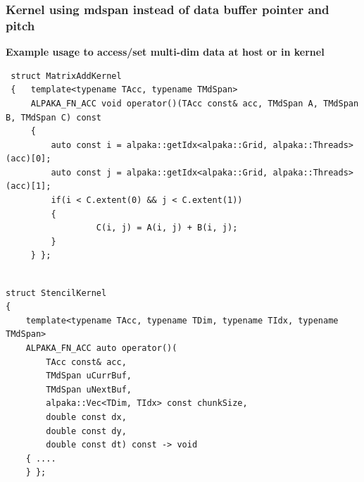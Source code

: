 \documentclass[9pt]{beamer}
\begin{document}
\begin{frame} [fragile]
\frametitle{Kernel using mdspan instead of data buffer pointer and pitch}
\lstset{basicstyle=\ttfamily\tiny}

\textbf{Example usage to access/set multi-dim data at host or in kernel}
 \lstset{basicstyle=\ttfamily\scriptsize}
 \begin{lstlisting}
 struct MatrixAddKernel
 {   template<typename TAcc, typename TMdSpan>
     ALPAKA_FN_ACC void operator()(TAcc const& acc, TMdSpan A, TMdSpan B, TMdSpan C) const
     {
         auto const i = alpaka::getIdx<alpaka::Grid, alpaka::Threads>(acc)[0];
         auto const j = alpaka::getIdx<alpaka::Grid, alpaka::Threads>(acc)[1];
         if(i < C.extent(0) && j < C.extent(1))
         {
                  C(i, j) = A(i, j) + B(i, j);
         }
     } };
 \end{lstlisting}
\begin{lstlisting}

struct StencilKernel
{
    template<typename TAcc, typename TDim, typename TIdx, typename TMdSpan>
    ALPAKA_FN_ACC auto operator()(
        TAcc const& acc,
        TMdSpan uCurrBuf,
        TMdSpan uNextBuf,
        alpaka::Vec<TDim, TIdx> const chunkSize,
        double const dx,
        double const dy,
        double const dt) const -> void
    { ....
    } };

\end{lstlisting}
\end{frame}
\end{document}
